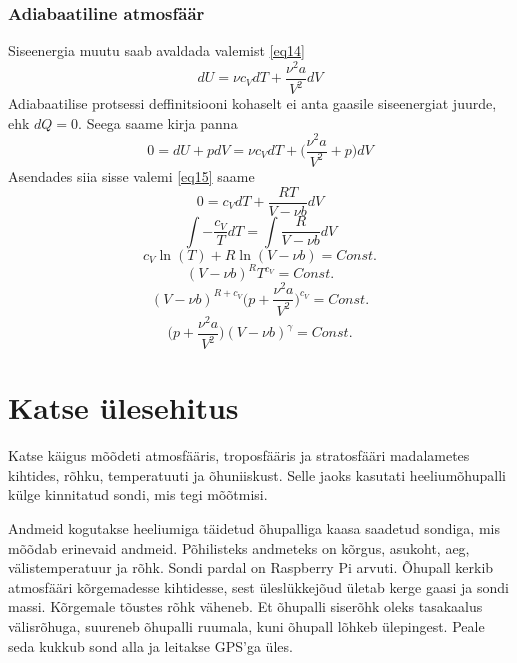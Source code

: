 \documentclass{trkut}%
\begin{document}
\subsection{Adiabaatiline atmosfäär}
Siseenergia muutu saab avaldada valemist \ref{eq14}
\begin{equation*}
dU = \nu c_VdT + \frac{\nu^2 a}{V^2}dV
\end{equation*}
Adiabaatilise protsessi deffinitsiooni kohaselt ei anta gaasile siseenergiat juurde, ehk $dQ = 0$. Seega saame kirja panna
\begin{equation*}
0 = dU + pdV = \nu c_V dT + \bigg( \frac{\nu^2 a}{V^2} + p \bigg) dV
\end{equation*}
Asendades siia sisse valemi \ref{eq15} saame
\begin{equation*}
0 = c_V dT + \frac{RT}{V - \nu b}dV
\end{equation*}
\begin{equation*}
\int - \frac{c_V}{T} dT = \int \frac{R}{V - \nu b}dV
\end{equation*}
\begin{equation*}
c_V \ln(T) + R \ln(V - \nu b) = Const.
\end{equation*}
\begin{equation*}
(V - \nu b)^R T^{c_V} = Const.
\end{equation*}
\begin{equation*}
(V - \nu b)^{R + c_V} \bigg( p + \frac{\nu^2 a}{V^2} \bigg)^{c_V} = Const.
\end{equation*}
\begin{equation*}
 \bigg( p + \frac{\nu^2 a}{V^2} \bigg) (V - \nu b)^\gamma = Const.
\end{equation*}


\chapter{Katse ülesehitus}
Katse käigus mõõdeti atmosfääris, troposfääris ja stratosfääri madalametes kihtides, rõhku, temperatuuti ja õhuniiskust. Selle jaoks kasutati heeliumõhupalli külge kinnitatud sondi, mis tegi mõõtmisi.

Andmeid kogutakse heeliumiga täidetud õhupalliga kaasa saadetud sondiga, mis mõõdab erinevaid andmeid. Põhilisteks andmeteks on kõrgus, asukoht, aeg, välistemperatuur ja rõhk. Sondi pardal on Raspberry Pi arvuti. Õhupall kerkib atmosfääri kõrgemadesse kihtidesse, sest üleslükkejõud ületab kerge gaasi ja sondi massi. Kõrgemale tõustes rõhk väheneb. Et õhupalli siserõhk oleks tasakaalus välisrõhuga, suureneb õhupalli ruumala, kuni õhupall lõhkeb ülepingest. Peale seda kukkub sond alla ja leitakse GPS'ga üles.
\end{document}

